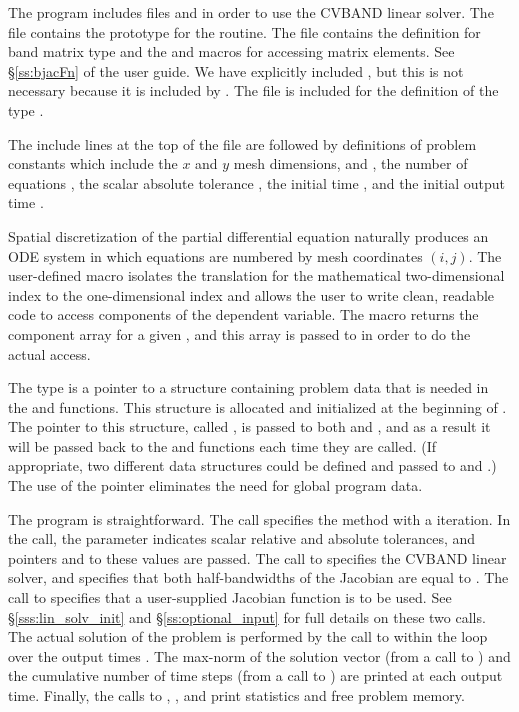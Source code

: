 The  program includes files  and
 in order to use the CVBAND linear solver. The 
file contains the prototype for the  routine. The 
file contains the definition for band matrix type  and the
 and  macros for accessing matrix
elements. See \S\ref{ss:bjacFn} of the user guide.
We have explicitly included , but this is not necessary because
it is included by .  The file  is
included for the definition of the type .

The include lines at the top of the file are followed by definitions of
problem constants which include the $x$ and $y$ mesh dimensions,  and
, the number of equations , the scalar absolute tolerance
, the initial time , and the initial output time .

Spatial discretization of the partial differential equation naturally
produces an ODE system in which equations are numbered by mesh
coordinates $(i,j)$. The user-defined macro  isolates the
translation for the mathematical two-dimensional index to the
one-dimensional  index and allows the user to write
clean, readable code to access components of the dependent variable. 
The  macro returns the component array for a given
, and this array is passed to  in order to do
the actual  access.

The type  is a pointer to a structure containing
problem data that is needed in the  and  functions.
This structure is allocated and initialized at the beginning
of . The pointer to this structure, called ,
is passed to both  and ,
and as a result it will be passed back to the  and 
functions each time they are called.  (If appropriate, two different
data structures could be defined and passed to  and .)
The use of the  pointer eliminates the need for global
program data.

The  program is straightforward.  The  call
specifies the  method with a  iteration. In the
 call, the parameter  indicates scalar relative
and absolute tolerances, and pointers  and  to
these values are passed.  The call to  specifies the CVBAND
linear solver, and specifies that both half-bandwidths of the Jacobian
are equal to .  The call to  specifies
that a user-supplied Jacobian function  is to be used.
See \S\ref{sss:lin_solv_init} and \S\ref{ss:optional_input} for full details
on these two calls.  The actual solution of the problem is performed by
the call to  within the loop over the output times .
The max-norm of the solution vector (from a call to ) and
the cumulative number of time steps (from a call to ) are
printed at each output time. Finally, the calls to ,
, and  print statistics and free problem memory.

